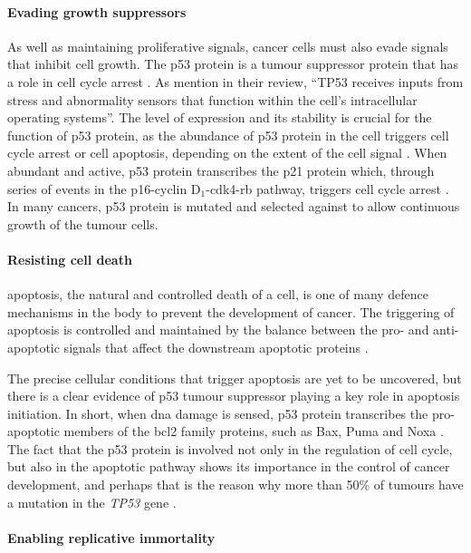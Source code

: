 \paragraph{Evading growth suppressors}

\noindent
As well as maintaining proliferative signals, cancer cells must also evade signals that inhibit cell growth.
The p53 protein is a tumour suppressor protein that has a  role in cell cycle arrest \citep{Hanahan2011,Levine1997}.
As \citet{Hanahan2011} mention in their review, ``TP53 receives inputs from stress and abnormality sensors that function within the cell's intracellular operating systems''.
The level of expression and its stability is crucial for the function of p53 protein, as the abundance of p53 protein in the cell triggers cell cycle arrest or cell \gls{apoptosis}, depending on the extent of the cell signal \citep{Fridman2003,Hanahan2011,Levine1997}.
When abundant and active, p53 protein transcribes the p21 protein which, through series of events in the p16-cyclin D$_1$-cdk4-\gls{rb} pathway, triggers cell cycle arrest \citep{Levine1997}.
In many cancers, p53 protein is mutated and selected against to allow continuous growth of the tumour cells.

\paragraph{Resisting cell death}

\noindent
\Gls{apoptosis}, the natural and controlled death of a cell, is one of many defence mechanisms in the body to prevent the development of cancer.
The triggering of \gls{apoptosis} is controlled and maintained by the balance between the pro- and anti-apoptotic signals that affect the downstream apoptotic proteins \citep{Hanahan2011}.

The precise cellular conditions that trigger apoptosis are yet to be uncovered, but there is a clear evidence of p53 tumour suppressor playing a key role in apoptosis initiation.
In short, when \acrshort{dna} damage is sensed, p53 protein transcribes the pro-apoptotic members of the \gls{bcl2} family proteins, such as Bax, Puma and Noxa \citep{Fridman2003,Hanahan2011}.
The fact that the p53 protein is involved not only in the regulation of cell cycle, but also in the apoptotic pathway shows its importance in the control of cancer development, and perhaps that is the reason why more than 50\% of tumours have a mutation in the \textit{TP53} gene \citep{Levine1997}.

\paragraph{Enabling replicative immortality}

